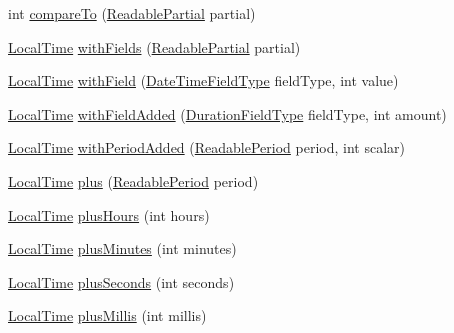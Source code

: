 \begin{DoxyCompactItemize}
\item 
int \hyperlink{classorg_1_1joda_1_1time_1_1_local_time_a451936d9dd3916f99c778f25870ee21c}{compare\-To} (\hyperlink{interfaceorg_1_1joda_1_1time_1_1_readable_partial}{Readable\-Partial} partial)
\item 
\hyperlink{classorg_1_1joda_1_1time_1_1_local_time}{Local\-Time} \hyperlink{classorg_1_1joda_1_1time_1_1_local_time_a40faeb7dff55a0059930650e3d5cf6b6}{with\-Fields} (\hyperlink{interfaceorg_1_1joda_1_1time_1_1_readable_partial}{Readable\-Partial} partial)
\item 
\hyperlink{classorg_1_1joda_1_1time_1_1_local_time}{Local\-Time} \hyperlink{classorg_1_1joda_1_1time_1_1_local_time_ae34d9653f0e4072aff0da33d88549037}{with\-Field} (\hyperlink{classorg_1_1joda_1_1time_1_1_date_time_field_type}{Date\-Time\-Field\-Type} field\-Type, int value)
\item 
\hyperlink{classorg_1_1joda_1_1time_1_1_local_time}{Local\-Time} \hyperlink{classorg_1_1joda_1_1time_1_1_local_time_a9a4b3e47343ddf560d97965d9f689719}{with\-Field\-Added} (\hyperlink{classorg_1_1joda_1_1time_1_1_duration_field_type}{Duration\-Field\-Type} field\-Type, int amount)
\item 
\hyperlink{classorg_1_1joda_1_1time_1_1_local_time}{Local\-Time} \hyperlink{classorg_1_1joda_1_1time_1_1_local_time_adf3bdf6506123fe6c82972bdf919ad25}{with\-Period\-Added} (\hyperlink{interfaceorg_1_1joda_1_1time_1_1_readable_period}{Readable\-Period} period, int scalar)
\item 
\hyperlink{classorg_1_1joda_1_1time_1_1_local_time}{Local\-Time} \hyperlink{classorg_1_1joda_1_1time_1_1_local_time_a046cac625dd542dc4cc3cc78c8a81e8a}{plus} (\hyperlink{interfaceorg_1_1joda_1_1time_1_1_readable_period}{Readable\-Period} period)
\item 
\hyperlink{classorg_1_1joda_1_1time_1_1_local_time}{Local\-Time} \hyperlink{classorg_1_1joda_1_1time_1_1_local_time_aaaefc3b963a85d924f921574d63dfbef}{plus\-Hours} (int hours)
\item 
\hyperlink{classorg_1_1joda_1_1time_1_1_local_time}{Local\-Time} \hyperlink{classorg_1_1joda_1_1time_1_1_local_time_a78765fe43d6782cc7f6ef8511bd44c99}{plus\-Minutes} (int minutes)
\item 
\hyperlink{classorg_1_1joda_1_1time_1_1_local_time}{Local\-Time} \hyperlink{classorg_1_1joda_1_1time_1_1_local_time_a8df4f70e290a9d6b0d9d713d6a85df9f}{plus\-Seconds} (int seconds)
\item 
\hyperlink{classorg_1_1joda_1_1time_1_1_local_time}{Local\-Time} \hyperlink{classorg_1_1joda_1_1time_1_1_local_time_adbd83b774721c60292d915ea21697fd7}{plus\-Millis} (int millis)

\end{DoxyCompactItemize}
